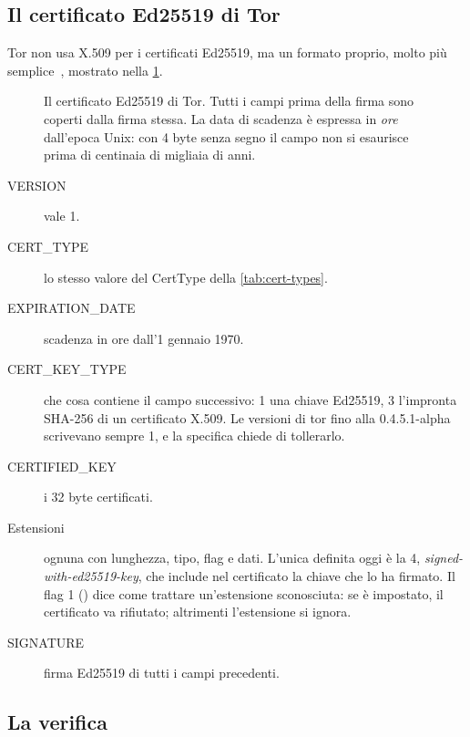 \subsection{Il certificato Ed25519 di Tor}

Tor non usa X.509 per i certificati Ed25519, ma un formato proprio, molto più semplice~, mostrato nella \cref{fig:cert-ed}.

\begin{figure}[htbp]
\centering

\caption{Il certificato Ed25519 di Tor. Tutti i campi prima della firma sono coperti dalla firma stessa. La data di scadenza è espressa in \emph{ore} dall'epoca Unix: con 4 byte senza segno il campo non si esaurisce prima di centinaia di migliaia di anni.}
\label{fig:cert-ed}
\end{figure}

\begin{description}
  \item[VERSION] vale 1.
  \item[CERT\_TYPE] lo stesso valore del CertType della \cref{tab:cert-types}.
  \item[EXPIRATION\_DATE] scadenza in ore dall'1 gennaio 1970.
  \item[CERT\_KEY\_TYPE] che cosa contiene il campo successivo: 1 una chiave Ed25519, 3 l'impronta SHA-256 di un certificato X.509. Le versioni di tor fino alla 0.4.5.1-alpha scrivevano sempre 1, e la specifica chiede di tollerarlo.
  \item[CERTIFIED\_KEY] i 32 byte certificati.
  \item[Estensioni] ognuna con lunghezza, tipo, flag e dati. L'unica definita oggi è la 4, \emph{signed-with-ed25519-key}, che include nel certificato la chiave che lo ha firmato. Il flag 1 () dice come trattare un'estensione sconosciuta: se è impostato, il certificato va rifiutato; altrimenti l'estensione si ignora.
  \item[SIGNATURE] firma Ed25519 di tutti i campi precedenti.
\end{description}

\subsection{La verifica}\label{sec:canale-verifica}


